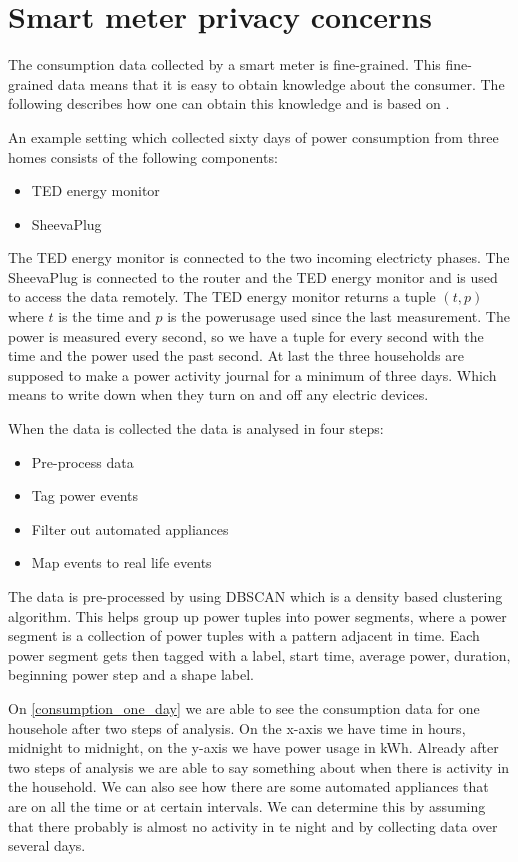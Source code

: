 \section{Smart meter privacy concerns}
The consumption data collected by a smart meter is fine-grained.
This fine-grained data means that it is easy to obtain knowledge about the consumer.
The following describes how one can obtain this knowledge and is based on \citet{privacy_memoir}.


An example setting which collected sixty days of power consumption from three homes consists of the following components:
\begin{itemize}
\item TED energy monitor
\item SheevaPlug
\end{itemize}
The TED energy monitor is connected to the two incoming electricty phases.
The SheevaPlug is connected to the router and the TED energy monitor and is used to access the data remotely.
The TED energy monitor returns a tuple $(t,p)$ where $t$ is the time and $p$ is the powerusage used since the last measurement.
The power is measured every second, so we have a tuple for every second with the time and the power used the past second.
At last the three households are supposed to make a power activity journal for a minimum of three days.
Which means to write down when they turn on and off any electric devices.

When the data is collected the data is analysed in four steps:
\begin{itemize}
\item Pre-process data
\item Tag power events
\item Filter out automated appliances
\item Map events to real life events
\end{itemize}

The data is pre-processed by using DBSCAN which is a density based clustering algorithm.
This helps group up power tuples into power segments, where a power segment is a collection of power tuples with a pattern adjacent in time.
Each power segment gets then tagged with a label, start time, average power, duration, beginning power step and a shape label.


On \cref{consumption_one_day} we are able to see the consumption data for one househole after two steps of analysis.
On the x-axis we have time in hours, midnight to midnight, on the y-axis we have power usage in kWh.
Already after two steps of analysis we are able to say something about when there is activity in the household.
We can also see how there are some automated appliances that are on all the time or at certain intervals.
We can determine this by assuming that there probably is almost no activity in te night and by collecting data over several days.


